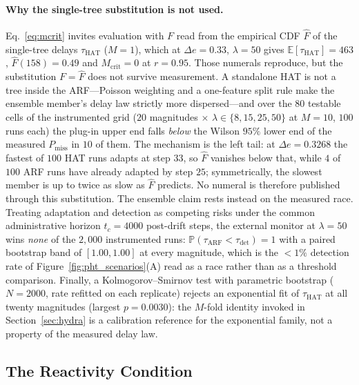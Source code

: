 \documentclass[smallextended]{svjour3}
\newcommand{\SixSeeds}{100}                  %
\newcommand{\SixCanonDeltaE}{0.3268}         %
\begin{document}
\paragraph{Why the single-tree substitution is not used.} Eq.~\eqref{eq:mcrit} invites evaluation with $F$ read from the empirical CDF $\widehat{F}$ of the single-tree delays $\tau_{\mathrm{HAT}}$ ($M = 1$), which at $\Delta e = 0.33$, $\lambda = 50$ gives $\mathbb{E}[\tau_{\mathrm{HAT}}] = 463$, $\widehat{F}(158) = 0.49$ and $M_{\mathrm{crit}} = 0$ at $r = 0.95$. Those numerals reproduce, but the substitution $F = \widehat{F}$ does not survive measurement. A standalone HAT is not a tree inside the ARF---Poisson weighting and a one-feature split rule make the ensemble member's delay law strictly more dispersed---and over the $80$ testable cells of the instrumented grid ($20$ magnitudes $\times$ $\lambda \in \{8, 15, 25, 50\}$ at $M = 10$, $\SixSeeds$ runs each) the plug-in upper end falls \emph{below} the Wilson $95\%$ lower end of the measured $P_{\mathrm{miss}}$ in $10$ of them. The mechanism is the left tail: at $\Delta e = \SixCanonDeltaE$ the fastest of $\SixSeeds$ HAT runs adapts at step $33$, so $\widehat{F}$ vanishes below that, while $4$ of $\SixSeeds$ ARF runs have already adapted by step $25$; symmetrically, the slowest member is up to twice as slow as $\widehat{F}$ predicts. No numeral is therefore published through this substitution.
The ensemble claim rests instead on the measured race. Treating adaptation and detection as competing risks under the common administrative horizon $t_c = 4000$ post-drift steps, the external monitor at $\lambda = 50$ wins \emph{none} of the $2{,}000$ instrumented runs: $\mathbb{P}(\tau_{\mathrm{ARF}} < \tau_{\mathrm{det}}) = 1$ with a paired bootstrap band of $[1.00, 1.00]$ at every magnitude, which is the ${<}1\%$ detection rate of Figure~\ref{fig:pht_scenarios}(A) read as a race rather than as a threshold comparison. Finally, a Kolmogorov--Smirnov test with parametric bootstrap ($N{=}2000$, rate refitted on each replicate) rejects an exponential fit of $\tau_{\mathrm{HAT}}$ at all twenty magnitudes (largest $p = 0.0030$): the $M$-fold identity invoked in Section~\ref{sec:hydra} is a calibration reference for the exponential family, not a property of the measured delay law.

\subsection{The Reactivity Condition}\label{sec:decoupling}
\end{document}
